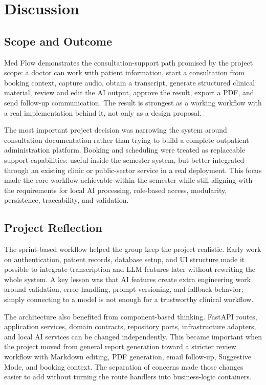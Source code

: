 \section{Discussion}
\label{sec:discussion}

\subsection{Scope and Outcome}
\label{subsec:discussion-scope-outcome}

Med Flow demonstrates the consultation-support path promised by the project scope: a doctor can work with patient information, start a consultation from booking context, capture audio, obtain a transcript, generate structured clinical material, review and edit the AI output, approve the result, export a PDF, and send follow-up communication. The result is strongest as a working workflow with a real implementation behind it, not only as a design proposal.

The most important project decision was narrowing the system around consultation documentation rather than trying to build a complete outpatient administration platform. Booking and scheduling were treated as replaceable support capabilities: useful inside the semester system, but better integrated through an existing clinic or public-sector service in a real deployment. This focus made the core workflow achievable within the semester while still aligning with the requirements for local AI processing, role-based access, modularity, persistence, traceability, and validation.

\subsection{Project Reflection}
\label{subsec:project-reflection}

The sprint-based workflow helped the group keep the project realistic. Early work on authentication, patient records, database setup, and UI structure made it possible to integrate transcription and LLM features later without rewriting the whole system. A key lesson was that AI features create extra engineering work around validation, error handling, prompt versioning, and fallback behavior; simply connecting to a model is not enough for a trustworthy clinical workflow.

The architecture also benefited from component-based thinking. FastAPI routes, application services, domain contracts, repository ports, infrastructure adapters, and local AI services can be changed independently. This became important when the project moved from general report generation toward a stricter review workflow with Markdown editing, PDF generation, email follow-up, Suggestive Mode, and booking context. The separation of concerns made those changes easier to add without turning the route handlers into business-logic containers.

